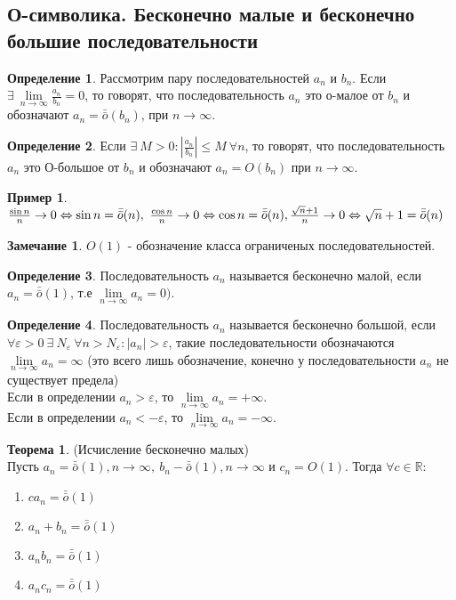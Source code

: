 \documentclass[a4paper, 12pt]{article}
\newcommand{\R}{\mathbb{R}}
\renewcommand{\epsilon}{\varepsilon}
\newcommand{\lims}{\lim\limits_{n\to \infty}}
\newcommand{\om}{\bar{\bar{o}}}
\theoremstyle{definition}
\newtheorem*{definition}{Определение}
\newtheorem*{theorem}{Теорема}
\newtheorem*{comm}{Замечание}
\newtheorem*{example}{Пример}
\begin{document}
        \subsection{О-символика. Бесконечно малые и бесконечно большие последовательности}
        \begin{definition}
            Рассмотрим пару последовательностей $a_n$ и $b_n$. Если\\ $\exists\ \lims \frac{a_n}{b_n}=0$, то говорят, что последовательность $a_n$ это о-малое от $b_n$ и обозначают $a_n=\om(b_n)$, при $n\to \infty$. 
        \end{definition} 
        \begin{definition}
            Если $\exists\ M>0: |\frac{a_n}{b_n}|\leq M\ \forall n$, то говорят, что последовательность $a_n$ это О-большое от $b_n$ и обозначают $a_n=O(b_n)$ при $n\to \infty$.
        \end{definition} 
        \begin{example}
            $\frac{\sin n}{n}\to 0 \Leftrightarrow \sin n = \om(n),\ \frac{\cos n}{n}\to 0 \Leftrightarrow \cos n = \om(n),\\ \frac{\sqrt{n}+1}{n}\to 0 \Leftrightarrow \sqrt{n}+1 = \om(n)$\\
        \end{example}
        \begin{comm}
            $O(1)$ - обозначение класса ограниченых последовательностей.
        \end{comm} 
        \begin{definition}
            Последовательность $a_n$ называется бесконечно малой, если\\ $a_n=\om(1)$, т.е $\lims a_n=0)$.
        \end{definition} 
        \begin{definition}
            Последовательность $a_n$ называется бесконечно большой, если\\ $\forall \epsilon>0\ \exists\ N_{\epsilon}\ \forall n>N_{\epsilon}: |a_n|>\epsilon$, такие последовательности обозначаются $\lims a_n=\infty$ (это всего лишь обозначение, конечно у последовательности $a_n$ не существует предела)\\
            Если в определении $a_n>\epsilon$, то $\lims a_n=+\infty$.\\
            Если в определении $a_n<-\epsilon$, то $\lims a_n=-\infty$.
        \end{definition} 
        \begin{theorem} (Исчисление бесконечно малых)\\
            Пусть $a_n=\om(1), n\to \infty,\ b_n-\om(1), n\to \infty$ и $c_n=O(1)$. Тогда $\forall c\in \R$:
            \begin{enumerate}
                \item $ca_n=\om(1)$
                \item $a_n+b_n=\om(1)$
                \item $a_nb_n=\om(1)$
                \item $a_nc_n=\om(1)$
            \end{enumerate}
        \end{theorem} 
\end{document}

